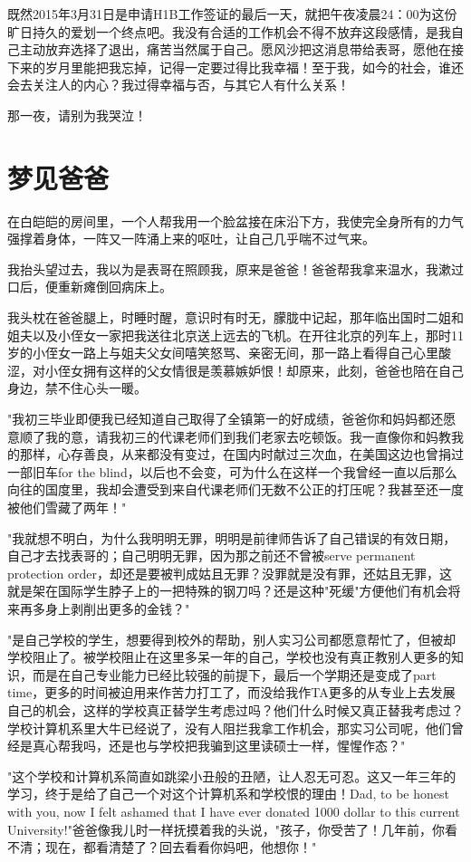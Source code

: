 \documentclass[12pt]{book}
\begin{document}
既然2015年3月31日是申请H1B工作签证的最后一天，就把午夜凌晨24：00为这份旷日持久的爱划一个终点吧。我没有合适的工作机会不得不放弃这段感情，是我自己主动放弃选择了退出，痛苦当然属于自己。愿风沙把这消息带给表哥，愿他在接下来的岁月里能把我忘掉，记得一定要过得比我幸福！至于我，如今的社会，谁还会去关注人的内心？我过得幸福与否，与其它人有什么关系！

那一夜，请别为我哭泣！
\chapter{梦见爸爸}
\label{sec-46}
在白皑皑的房间里，一个人帮我用一个脸盆接在床沿下方，我使完全身所有的力气强撑着身体，一阵又一阵涌上来的呕吐，让自己几乎喘不过气来。

我抬头望过去，我以为是表哥在照顾我，原来是爸爸！爸爸帮我拿来温水，我漱过口后，便重新瘫倒回病床上。

我头枕在爸爸腿上，时睡时醒，意识时有时无，朦胧中记起，那年临出国时二姐和姐夫以及小侄女一家把我送往北京送上远去的飞机。在开往北京的列车上，那时11岁的小侄女一路上与姐夫父女间嘻笑怒骂、亲密无间，那一路上看得自己心里酸涩，对小侄女拥有这样的父女情很是羡慕嫉妒恨！却原来，此刻，爸爸也陪在自己身边，禁不住心头一暖。

"我初三毕业即便我已经知道自己取得了全镇第一的好成绩，爸爸你和妈妈都还愿意顺了我的意，请我初三的代课老师们到我们老家去吃顿饭。我一直像你和妈教我的那样，心存善良，从来都没有变过，在国内时献过三次血，在美国这边也曾捐过一部旧车for the blind，以后也不会变，可为什么在这样一个我曾经一直以后那么向往的国度里，我却会遭受到来自代课老师们无数不公正的打压呢？我甚至还一度被他们雪藏了两年！"

"我就想不明白，为什么我明明无罪，明明是前律师告诉了自己错误的有效日期，自己才去找表哥的；自己明明无罪，因为那之前还不曾被serve permanent protection order，却还是要被判成姑且无罪？没罪就是没有罪，还姑且无罪，这就是架在国际学生脖子上的一把特殊的钢刀吗？还是这种"死缓"方便他们有机会将来再多身上剥削出更多的金钱？"

"是自己学校的学生，想要得到校外的帮助，别人实习公司都愿意帮忙了，但被却学校阻止了。被学校阻止在这里多呆一年的自己，学校也没有真正教别人更多的知识，而是在自己专业能力已经比较强的前提下，最后一个学期还是变成了part time，更多的时间被迫用来作苦力打工了，而没给我作TA更多的从专业上去发展自己的机会，这样的学校真正替学生考虑过吗？他们什么时候又真正替我考虑过？学校计算机系里大牛已经说了，没有人阻拦我拿工作机会，那实习公司呢，他们曾经是真心帮我吗，还是也与学校把我骗到这里读硕士一样，惺惺作态？"

"这个学校和计算机系简直如跳梁小丑般的丑陋，让人忍无可忍。这又一年三年的学习，终于是给了自己一个对这个计算机系和学校恨的理由！Dad, to be honest with you, now I felt ashamed that I have ever donated 1000 dollar to this current University!"爸爸像我儿时一样抚摸着我的头说，"孩子，你受苦了！几年前，你看不清；现在，都看清楚了？回去看看你妈吧，他想你！"
\end{document}

